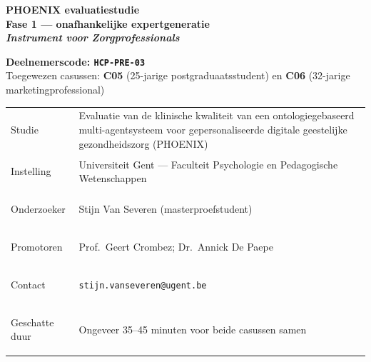 \documentclass[11pt,a4paper]{article}
\renewcommand{\arraystretch}{1.28}
\begin{document}
\begin{titlepage}
\centering\vspace*{0.6cm}

\begin{tcolorbox}[
  colback=DarkBlue,colframe=DarkBlue,
  arc=3mm,left=14pt,right=14pt,top=12pt,bottom=12pt,
  width=\textwidth
]
\centering
{\fontsize{22}{28}\selectfont\bfseries\color{white}
PHOENIX evaluatiestudie\\[0.3em]
\fontsize{15}{20}\selectfont\color{AccentBlue}
Fase 1 --- onafhankelijke expertgeneratie\\[0.2em]
\fontsize{12}{16}\selectfont\color{white}
\textit{Instrument voor Zorgprofessionals}
}
\end{tcolorbox}

\vspace{0.7cm}

\begin{tcolorbox}[
  colback=AccentBlue,colframe=PrimaryBlue,
  arc=2.5mm,boxrule=1.2pt,left=12pt,right=12pt,top=10pt,bottom=10pt,
  width=0.86\textwidth
]
\centering
{\large\bfseries\color{DarkBlue}Deelnemerscode: \texttt{HCP-PRE-03}}\\[0.5em]
{\normalsize\color{SlateMid}
Toegewezen casussen:\quad
\textbf{\color{PrimaryBlue}C05} (25-jarige postgraduaatsstudent)
\quad en \quad
\textbf{\color{PrimaryBlue}C06} (32-jarige marketingprofessional)
}
\end{tcolorbox}

\vspace{0.6cm}

\begin{tcolorbox}[
  colback=SoftBG,colframe=BorderGrey,
  arc=2mm,left=10pt,right=10pt,top=9pt,bottom=9pt,
  width=0.92\textwidth
]
\small\renewcommand{\arraystretch}{1.28}
\begin{tabularx}{\textwidth}{@{}>{\bfseries\raggedright\arraybackslash}p{}X@{}}
Studie & Evaluatie van de klinische kwaliteit van een ontologiegebaseerd multi-agentsysteem voor gepersonaliseerde digitale geestelijke gezondheidszorg (PHOENIX) \\
Instelling & Universiteit Gent --- Faculteit Psychologie en Pedagogische Wetenschappen \\
Onderzoeker & Stijn Van Severen (masterproefstudent) \\
Promotoren & Prof.\ Geert Crombez; Dr.\ Annick De Paepe \\
Contact & \texttt{stijn.vanseveren@ugent.be} \\
Geschatte duur & Ongeveer 35--45 minuten voor beide casussen samen \\
\end{tabularx}
\end{tcolorbox}


\end{titlepage}
\end{document}
